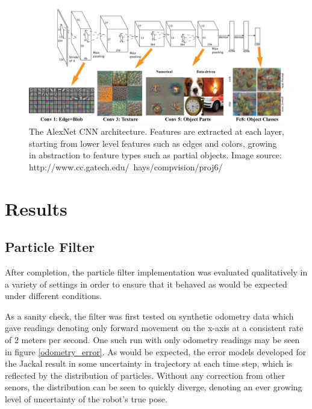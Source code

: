 \documentclass[letterpaper, 12 pt, conference]{ieeeconf}  %
\begin{document}
\begin{figure}[h]
\centering
\includegraphics[scale=1.0]{alexnet}
\caption{The AlexNet CNN architecture. Features are extracted at each layer, starting from lower level features such as edges and colors, growing in abstraction to feature types such as partial objects. Image source: http://www.cc.gatech.edu/~hays/compvision/proj6/}
\end{figure}



\section{Results}

\subsection{Particle Filter}

After completion, the particle filter implementation was evaluated qualitatively in a variety of settings in order to ensure that it behaved as would be expected under different conditions. 
\par
As a sanity check, the filter was first tested on synthetic odometry data which gave readings denoting only forward movement on the x-axis at a consistent rate of 2 meters per second. One such run with only odometry readings may be seen in figure \ref{odometry_error}. As would be expected, the error models developed for the Jackal result in some uncertainty in trajectory at each time step, which is reflected by the distribution of particles. Without any correction from other senors, the distribution can be seen to quickly diverge, denoting an ever growing level of uncertainty of the robot's true pose. 
\end{document}
